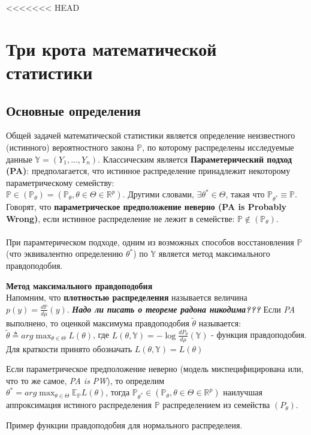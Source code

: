 <<<<<<< HEAD
\section{Три крота математической статистики}

\subsection{Основные определения}
Общей задачей математической статистики является определение неизвестного (истинного) вероятностного закона  $\mathbb{P}$, по которому распределены исследуемые данные $\mathbb{Y} = (Y_1, ..., Y_n)$. Классическим является \textbf{Параметерический подход (PA)}:
предполагается, что истинное распределение принадлежит некоторому параметрическому семейству:\\
 $\mathbb{P} \in (\mathbb{P}_{\theta}) = (\mathbb{P}_{\theta}, \theta \in \Theta \in \mathbb{R}^p)$. Другими словами, $\exists \theta^* \in \Theta$, такая что $\mathbb{P}_{\theta^*} \equiv \mathbb{P}$.\\
 Говорят, что \textbf{параметрическое предположение неверно (PA is Probably Wrong)}, если истинное распределение не лежит в семействе:  $\mathbb{P} \not\in (\mathbb{P}_{\theta})$.\\
\\
При парамтерическом подходе, одним из возможных способов восстановления $\mathbb{P}$ (что эквивалентно определению $\theta^*$) по $\mathbb{Y}$ является метод максимального правдоподобия.

\begin{definition}\textbf{Метод максимального правдоподобия}\\
Напомним, что \textbf{плотностью распределения} называется величина $p(y) = \frac{d\mathbb{P}}{d\mathbb{\mu}}(y)$. \textbf{\textit{Надо ли писать о теореме радона никодима???}}
Если \textit{PA} выполнено, то оценкой максимума правдоподобия $\tilde{\theta}$ называется:
$\tilde{\theta} \triangleq arg\max_{\theta \in \Theta} L(\theta)$, где $L(\theta, \mathbb{Y}) = -\log \frac{dP_{\theta}}{d\mu}(\mathbb{Y})$ - функция правдоподобия. Для краткости принято обозначать $L(\theta, \mathbb{Y}) = L(\theta)$\\
\end{definition}

Если параметрическое предположение неверно (модель миспецифицирована или, что то же самое, \textit{PA is PW}), то определим\\
$\theta^* = arg\max_{\theta \in \Theta} \mathbb{E}_{\mathbb{P}} L(\theta)$, тогда $\mathbb{P}_{\theta^*} \in (\mathbb{P}_{\theta}, \theta \in \Theta \in \mathbb{R}^p) $ наилучшая аппроксимация истиного распределения $\mathbb{P}$ распределением из семейства $(P_{\theta})$.
\begin{example} Пример функции правдоподобия для нормального распределеия.
\end{example}

